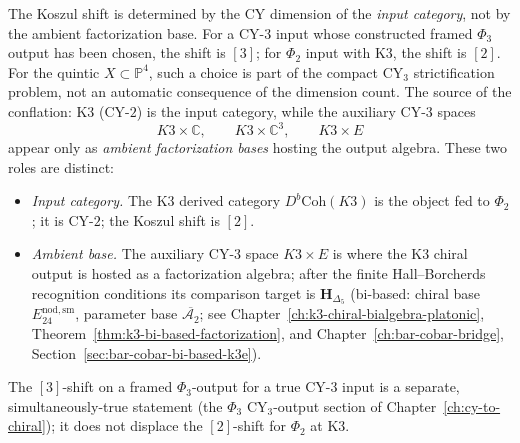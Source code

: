 \begin{remark}
\label{rem:ambient-vs-input-shift-k3}
The Koszul shift is determined by the CY dimension of the \emph{input category}, not by the ambient factorization base. For a CY-$3$ input whose constructed framed $\Phi_3$ output has been chosen, the shift is $[3]$; for $\Phi_2$ input with K3, the shift is $[2]$. For the quintic $X\subset\mathbb{P}^4$, such a choice is part of the compact CY$_3$ strictification problem, not an automatic consequence of the dimension count. The source of the conflation: K3 (CY-$2$) is the input category, while the auxiliary CY-$3$ spaces
\[
 K3\times\mathbb{C},\qquad K3\times\mathbb{C}^3,\qquad K3\times E
\]
appear only as \emph{ambient factorization bases} hosting the output algebra. These two roles are distinct:
\begin{itemize}
\item \emph{Input category.} The K3 derived category $D^b\mathrm{Coh}(K3)$ is the object fed to $\Phi_2$; it is CY-$2$; the Koszul shift is $[2]$.
\item \emph{Ambient base.} The auxiliary CY-$3$ space $K3\times E$ is where the K3 chiral output is hosted as a factorization algebra; after the finite Hall--Borcherds recognition conditions its comparison target is $\mathbf{H}_{\Delta_5}$ (bi-based: chiral base $E^{\mathrm{nod,sm}}_{24}$, parameter base $\overline{\mathcal{A}_2}$; see Chapter~\ref{ch:k3-chiral-bialgebra-platonic}, Theorem~\ref{thm:k3-bi-based-factorization}, and Chapter~\ref{ch:bar-cobar-bridge}, Section~\ref{sec:bar-cobar-bi-based-k3e}).
\end{itemize}
The $[3]$-shift on a framed $\Phi_3$-output for a true CY-$3$ input is a separate, simultaneously-true statement (the $\Phi_3$ CY$_3$-output section of Chapter~\ref{ch:cy-to-chiral}); it does not displace the $[2]$-shift for $\Phi_2$ at K3.
\end{remark}


